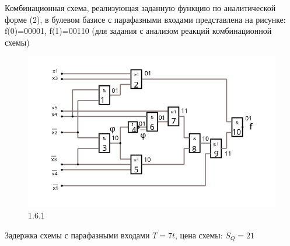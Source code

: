 Комбинационная схема, реализующая заданную функцию по аналитической 
форме (2), в булевом базисе с парафазными входами представлена  на  рисунке: \\
f(0)=00001, f(1)=00110 (для задания с анализом реакций комбинационной схемы)
\begin{figure}[h!]
  \begin{center}
  \includegraphics[width=\linewidth]{imgs/circuit-boolean_basis.png}
  \end{center}
  \caption{1.6.1}
  \label{fig:boolean_circuit}
\end{figure}
Задержка схемы с парафазными входами $T=7t$, цена схемы: $S_Q = 21$ 